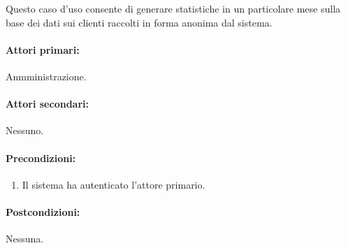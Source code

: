 \documentclass{article}
\begin{document}
	\indent\indent Questo caso d'uso consente di generare statistiche in un particolare mese sulla base dei dati sui clienti raccolti in forma anonima dal sistema.
	
	\paragraph{Attori primari:}Anmministrazione.
	
	\paragraph{Attori secondari:}Nessuno.
	
	\paragraph{Precondizioni:}
	\begin{enumerate}[itemsep=8pt,parsep=0pt]
		\item Il sistema ha autenticato l'attore primario.
	\end{enumerate}
	
	\paragraph{Postcondizioni:}Nessuna.
	
\end{document}
